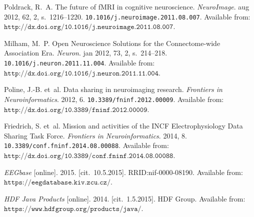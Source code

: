 \documentclass[conference]{IEEEtran}
\begin{document}

%
%
%

\begin{thebibliography}{1}


{\sc Poldrack}, R.~A.
\newblock The future of {fMRI} in cognitive neuroscience.
\newblock \emph{{NeuroImage}}. aug 2012, 62, 2, s.~1216--1220.
\newblock \texttt{10.1016/j.neuroimage.2011.08.007}.
\newblock Available from:
$\texttt{{http://dx.doi.org/10.1016/j.neuroimage.2011.08.007}}$.

{\sc Milham}, M.~P.
\newblock Open Neuroscience Solutions for the Connectome-wide Association Era.
\newblock \emph{Neuron}. jan 2012, 73, 2, s.~214--218.
\newblock \texttt{10.1016/j.neuron.2011.11.004}.
\newblock Available from:
$\texttt{{http://dx.doi.org/10.1016/j.neuron.2011.11.004}}$.

{\sc Poline}, J.-B. et~al.
\newblock Data sharing in neuroimaging research.
\newblock \emph{Frontiers in Neuroinformatics}. 2012, 6.
\newblock \texttt{10.3389/fninf.2012.00009}.
\newblock Available from:
$\texttt{{http://dx.doi.org/10.3389/fninf.2012.00009}}$.

{\sc Friedrich}, S. et~al.
\newblock Mission and activities of the {INCF} Electrophysiology Data Sharing
Task Force.
\newblock \emph{Frontiers in Neuroinformatics}. 2014, 8.
\newblock \texttt{10.3389/conf.fninf.2014.08.00088}.
\newblock Available from:
$\texttt{{http://dx.doi.org/10.3389/conf.fninf.2014.08.00088}}$.


\emph{EEGbase} [online]. 2015. [cit.~10.5.2015]. RRID:nif-0000-08190.
\newblock Available from: $\texttt{{https://eegdatabase.kiv.zcu.cz/}}$.


\emph{HDF Java Products} [online]. 2014. [cit.~1.5.2015]. HDF Group.
\newblock Available from: $\texttt{{https://www.hdfgroup.org/products/java/}}$.




\end{thebibliography}
\end{document}
